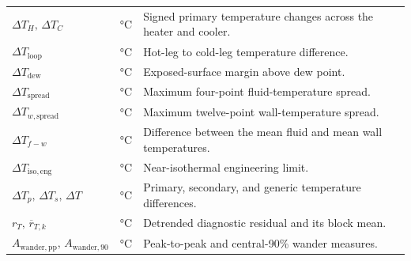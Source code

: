 \documentclass[11pt]{article}
\begin{document}
\begin{longtable}{@{}>{\raggedright\arraybackslash}p{1.62in}>{\raggedright\arraybackslash}p{1.12in}>{\raggedright\arraybackslash}p{3.76in}@{}}
$\Delta T_H,\,\Delta T_C$ & \si{\degreeCelsius} & Signed primary temperature changes across the heater and cooler. \\
$\Delta T_{\mathrm{loop}}$ & \si{\degreeCelsius} & Hot-leg to cold-leg temperature difference. \\
$\Delta T_{\mathrm{dew}}$ & \si{\degreeCelsius} & Exposed-surface margin above dew point. \\
$\Delta T_{\mathrm{spread}}$ & \si{\degreeCelsius} & Maximum four-point fluid-temperature spread. \\
$\Delta T_{w,\mathrm{spread}}$ & \si{\degreeCelsius} & Maximum twelve-point wall-temperature spread. \\
$\Delta T_{f-w}$ & \si{\degreeCelsius} & Difference between the mean fluid and mean wall temperatures. \\
$\Delta T_{\mathrm{iso,eng}}$ & \si{\degreeCelsius} & Near-isothermal engineering limit. \\
$\Delta T_p,\,\Delta T_s,\,\Delta T$ & \si{\degreeCelsius} & Primary, secondary, and generic temperature differences. \\
$r_T,\,\overline r_{T,k}$ & \si{\degreeCelsius} & Detrended diagnostic residual and its block mean. \\
$A_{\mathrm{wander,pp}},\,A_{\mathrm{wander,90}}$ & \si{\degreeCelsius} & Peak-to-peak and central-90\% wander measures. \\
\end{longtable}
\endgroup
\end{document}
